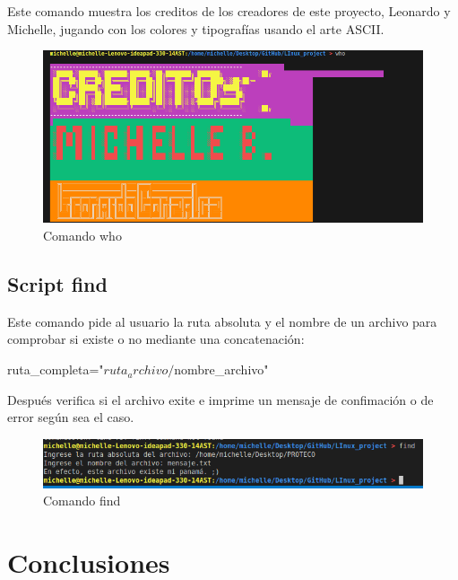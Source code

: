 \documentclass{article}
\begin{document}
Este comando muestra los creditos de los creadores de este proyecto, Leonardo y Michelle, jugando con los colores y tipografías usando el arte ASCII.

\begin{figure}[ht]
\centering
\includegraphics[width=1\textwidth]{cap5.png}
\caption{\label{fig:frog10} Comando who}
\end{figure}
\subsection*{Script find}

Este comando pide al usuario la ruta absoluta y el nombre de un archivo para comprobar si existe o no mediante una concatenación: 

\begin{bashcode}
ruta_completa="$ruta_archivo/$nombre_archivo"
\end{bashcode}

Después verifica si el archivo exite e imprime un mensaje de confimación o de error según sea el caso.


\begin{figure}[ht]
\centering
\includegraphics[width=1\textwidth]{cap9.png}
\caption{\label{fig:frog11} Comando find}
\end{figure}

\section*{Conclusiones}
\end{document}
